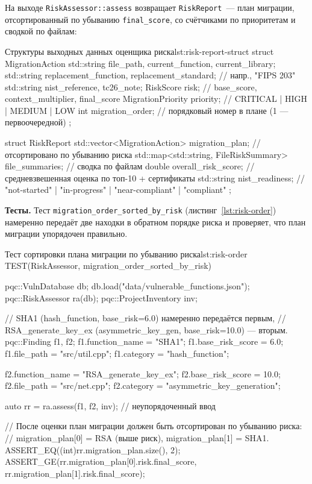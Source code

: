 На выходе \texttt{RiskAssessor::assess} возвращает \texttt{RiskReport}~---
план миграции, отсортированный по убыванию \texttt{final\_score},
со счётчиками по приоритетам и сводкой по файлам:

\begin{itmolisting}[C++]{Структуры выходных данных оценщика риска}{lst:risk-report-struct}
struct MigrationAction {
    std::string file_path, current_function, current_library;
    std::string replacement_function, replacement_standard; // напр., "FIPS 203"
    std::string nist_reference, tc26_note;
    RiskScore   risk;          // base_score, context_multiplier, final_score
    MigrationPriority priority; // CRITICAL | HIGH | MEDIUM | LOW
    int migration_order;        // порядковый номер в плане (1 — первоочередной)
};

struct RiskReport {
    std::vector<MigrationAction> migration_plan; // отсортировано по убыванию риска
    std::map<std::string, FileRiskSummary> file_summaries; // сводка по файлам
    double overall_risk_score; // средневзвешенная оценка по топ-10 + сертификаты
    std::string nist_readiness; // "not-started" | "in-progress" | "near-compliant" | "compliant"
};
\end{itmolisting}

\textbf{Тесты.}
Тест \texttt{migration\_order\_sorted\_by\_risk}
(листинг~\ref{lst:risk-order}) намеренно передаёт две находки
в обратном порядке риска и проверяет, что план миграции
упорядочен правильно.

\begin{itmolisting}[C++]{Тест сортировки плана миграции по убыванию риска}{lst:risk-order}
TEST(RiskAssessor, migration_order_sorted_by_risk) {
    pqc::VulnDatabase db;
    db.load("data/vulnerable_functions.json");
    pqc::RiskAssessor ra(db);
    pqc::ProjectInventory inv;

    // SHA1 (hash_function, base_risk=6.0) намеренно передаётся первым,
    // RSA_generate_key_ex (asymmetric_key_gen, base_risk=10.0) — вторым.
    pqc::Finding f1, f2;
    f1.function_name = "SHA1";
    f1.base_risk_score = 6.0; f1.file_path = "src/util.cpp";
    f1.category = "hash_function";

    f2.function_name = "RSA_generate_key_ex";
    f2.base_risk_score = 10.0; f2.file_path = "src/net.cpp";
    f2.category = "asymmetric_key_generation";

    auto rr = ra.assess({f1, f2}, inv); // неупорядоченный ввод

    // После оценки план миграции должен быть отсортирован по убыванию риска:
    // migration_plan[0] = RSA (выше риск), migration_plan[1] = SHA1.
    ASSERT_EQ((int)rr.migration_plan.size(), 2);
    ASSERT_GE(rr.migration_plan[0].risk.final_score,
              rr.migration_plan[1].risk.final_score);
}
\end{itmolisting}

